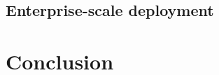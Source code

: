 \documentclass[letterpaper]{article}
\begin{document}
\subsection{Enterprise-scale deployment}
\section{Conclusion}



\end{document}
